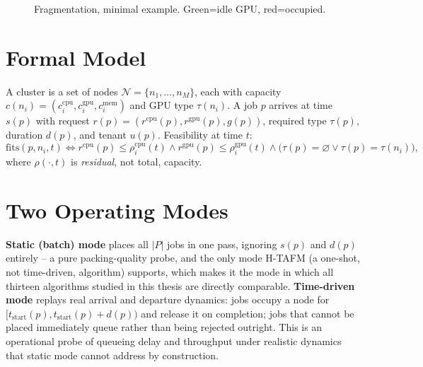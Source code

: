 \documentclass[12pt]{report}
\newcommand{\N}{\mathcal{N}}
\begin{document}
\begin{figure}[h]
\centering
{}
\caption{Fragmentation, minimal example. Green=idle GPU, red=occupied.}
\label{fig:th-frag-concept}
\end{figure}

\section{Formal Model}
A cluster is a set of nodes $\N=\{n_1,\dots,n_M\}$, each with capacity
$c(n_i)=(c^{\text{cpu}}_i, c^{\text{gpu}}_i, c^{\text{mem}}_i)$ and GPU
type $\tau(n_i)$. A job $p$ arrives at time $s(p)$ with request
$r(p)=(r^{\text{cpu}}(p), r^{\text{gpu}}(p), g(p))$, required type
$\tau(p)$, duration $d(p)$, and tenant $u(p)$. Feasibility at time $t$:
\[
  \mathrm{fits}(p,n_i,t) \iff r^{\text{cpu}}(p)\leq\rho^{\text{cpu}}_i(t)
  \wedge r^{\text{gpu}}(p)\leq\rho^{\text{gpu}}_i(t)
  \wedge \big(\tau(p)=\varnothing \vee \tau(p)=\tau(n_i)\big),
\]
where $\rho(\cdot,t)$ is \emph{residual}, not total, capacity.

\section{Two Operating Modes}
\textbf{Static (batch) mode} places all $|P|$ jobs in one pass, ignoring
$s(p)$ and $d(p)$ entirely -- a pure packing-quality probe, and the only
mode H-TAFM (a one-shot, not time-driven, algorithm) supports, which
makes it the mode in which all thirteen algorithms studied in this thesis
are directly comparable. \textbf{Time-driven mode} replays real arrival
and departure dynamics: jobs occupy a node for
$[t_{\text{start}}(p), t_{\text{start}}(p){+}d(p))$ and release it on
completion; jobs that cannot be placed immediately queue rather than
being rejected outright. This is an operational probe of queueing delay
and throughput under realistic dynamics that static mode cannot address
by construction.
\end{document}
